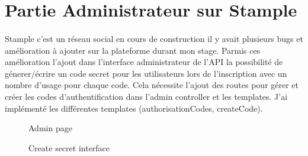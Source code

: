 \section{Partie Administrateur sur Stample}
\paragraph{}
Stample c'est un réseau social en cours de construction il y avait plusieurs bugs et amélioration à ajouter sur la plateforme durant mon stage.
Parmis ces amélioration l'ajout dans l'interface administrateur de l'API la possibilité de génerer/écrire un code
secret pour les utilisateurs lors de l'inscription avec un nombre d'usage pour chaque code.
Cela nécessite l'ajout des routes pour gérer et créer les codes d'authentification dans l'admin 
controller et les templates.
J'ai implémenté les différentes templates (authorisationCodes, createCode).
\begin{figure}[H]
\begin{minipage}[c]{.5\linewidth}
\begin{center}
\caption{Admin page}
\label{fig:Admin page}
\end{center}
\end{minipage}
\hfill
\begin{minipage}[c]{.5\linewidth}
\begin{center}
\hspace{1em}
\caption{Create secret interface}
\label{fig:Create authorisationCode interface}
\end{center}
\end{minipage}
\end{figure}
